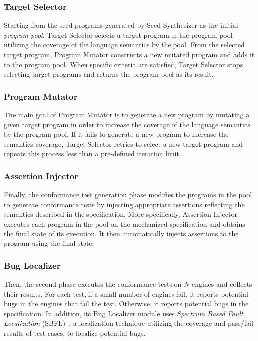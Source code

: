 \subsubsection{Target Selector}
Starting from the seed programs generated by \textsf{Seed Synthesizer}
as the initial \emph{program pool}, \textsf{Target Selector}
selects a target program in the program pool utilizing the coverage of the language semantics 
by the pool.
From the selected target program, \textsf{Program Mutator} constructs a new mutated program
and adds it to the program pool.  When specific criteria are satisfied,
\textsf{Target Selector} stops selecting target programs and returns
the program pool as its result.

\subsubsection{Program Mutator}
The main goal of \textsf{Program Mutator} is to generate a new program by
mutating a given target program in order to increase the coverage of
the language semantics by the program pool.
If it fails to generate a new program to increase the semantics coverage,
\textsf{Target Selector} retries to select a new target program and repeats this
process less than a pre-defined iteration limit.

\subsubsection{Assertion Injector}
Finally, the conformance test generation phase modifies the programs in the pool to generate
conformance tests by injecting appropriate assertions reflecting the
semantics described in the specification.  More specifically,
\textsf{Assertion Injector} executes each program in the pool on the mechanized
specification and obtains the final state of its execution.  It then
automatically injects assertions to the program using the final state.

\subsubsection{Bug Localizer}
Then, the second phase executes the conformance tests on $N$ engines and
collects their results.  For each test, if a small number of engines fail,
it reports potential bugs in the engines that fail the test.
Otherwise, it reports potential bugs in the specification.
In addition, its \textsf{Bug Localizer} module uses \textit{Spectrum
Based Fault Localization} (SBFL)~\cite{sbfl-survey}, a localization
technique utilizing the coverage and pass/fail results of test cases, to
localize potential bugs.
